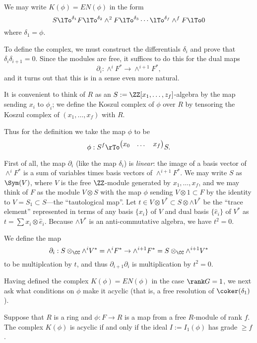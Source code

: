We may write
$K(\phi) = EN(\phi)$ in the form
$$
S \lTo^{\delta_{1}} F \lTo^{\delta_{2}} \wedge^{2}F \lTo^{\delta_{3}} \cdots \lTo^{\delta_{f}} \wedge^{f}F \lTo 0
$$
where $\delta_{1} = \phi$.

To define the complex, we must construct the differentials $\delta_{i}$ and prove that
$\delta_{i}\delta_{i+1} = 0$. Since the modules are free, it suffices to do this for the 
dual maps 
$$
\partial_{i}: \wedge^{i}F^{*} \to \wedge^{i+1}F^{*},
$$
and it turns out that this is in a sense even more natural. 

It is convenient to think of $R$ as an $S := \ZZ[x_{1},\dots, z_{f}]$-algebra by the map sending 
$x_{i}$ to $\phi_{i}$; we  define the Koszul complex of $\phi$ over $R$ by tensoring
the Koszul complex of $(x_{1}, \dots, x_{f})$ with $R$.

Thus for the definition we take the map $\phi$ to be 
$$
\phi: S^{f}\rTo^{
\begin{pmatrix}
x_{0} &\dots & x_{f}
\end{pmatrix}
} S.
$$

First of all, the map $\partial_{i}$ (like the map $\delta_{i}$) is \emph{linear}: the image of a basis vector of $\wedge^{i}F^{*} $ is a sum of variables times basis vectors
of $\wedge^{i+1}F^{*}$. We may write $S$ as $\Sym(V)$, where $V$ is the free $\ZZ$-module generated by $x_{1}, \dots, x_{f}$, and we may think of $F$ as the module $V\otimes S$ with the map
$\phi$ sending $V\otimes 1\subset F$ by the identity to $V = S_{1}\subset S$---the ``tautological map''. 
Let $t\in V\otimes V^{*}\subset S\otimes \wedge V^{*}$ be the ``trace element'' represented in terms of any basis $\{x_{i}\}$ of $V$
and dual basis $\{\hat e_{i}\}$ of $V^{*}$ as $t = \sum x_{i}\otimes \hat e_{i}$. Because $\wedge V^{*}$ is 
an anti-commutative algebra, we have $t^{2} = 0$.

We define the map 
$$
\partial_{i}: S\otimes_{\CC} \wedge^{i}V^{*} = \wedge^{i}F^{*}  \to \wedge^{i+1}F^{*} = S\otimes_{\CC} \wedge^{i+1}V^{*}
$$
to be multiplcation by $t$, and thus $\partial_{i+1}\partial_{i}$ is multiplication by $t^{2} = 0$.

Having defined the complex $K(\phi) = EN(\phi)$ in the case $\rank G = 1$, we next ask what conditions on $\phi$
make it acyclic (that is, a free resolution of $\coker (\delta_{1})$). 

\begin{theorem}\label{rankG1}
 Suppose that $R$ is a ring and $\phi: F\to R$ is a map from a free $R$-module of rank $f$.
 The complex $K(\phi)$ is acyclic if and only if the ideal $I := I_{1}(\phi)$ has grade $\geq f$.
 \end{theorem}

